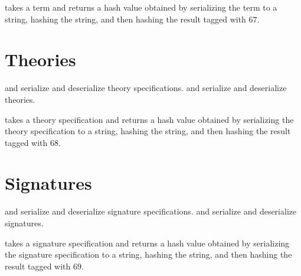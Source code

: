 {} takes a term and returns a hash value obtained by serializing the term
to a string, hashing the string, and then hashing the result tagged with $67$.

{}

\section{Theories}

{}
{}
{}

{} and {} serialize and deserialize theory specifications.
{} and {} serialize and deserialize theories.

{} takes a theory specification and returns a hash value obtained by serializing the
theory specification to a string, hashing the string, and then hashing the result tagged with $68$.

{}

{}

{}

{}


\section{Signatures}

{}
{}
{}
{}

{} and {} serialize and deserialize signature specifications.
{} and {} serialize and deserialize signatures.

{} takes a signature specification and returns a hash value obtained by serializing the
signature specification to a string, hashing the string, and then hashing the result tagged with $69$.

